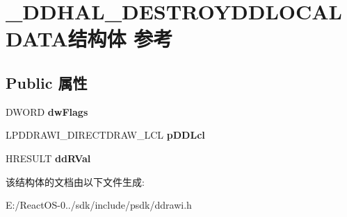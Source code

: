 \hypertarget{struct___d_d_h_a_l___d_e_s_t_r_o_y_d_d_l_o_c_a_l_d_a_t_a}{}\section{\+\_\+\+D\+D\+H\+A\+L\+\_\+\+D\+E\+S\+T\+R\+O\+Y\+D\+D\+L\+O\+C\+A\+L\+D\+A\+T\+A结构体 参考}
\label{struct___d_d_h_a_l___d_e_s_t_r_o_y_d_d_l_o_c_a_l_d_a_t_a}
\subsection*{Public 属性}
\begin{DoxyCompactItemize}
\item 
\mbox{\label{struct___d_d_h_a_l___d_e_s_t_r_o_y_d_d_l_o_c_a_l_d_a_t_a_a8cf196186831bc1743c93a982acfef25}} 
D\+W\+O\+RD {\bfseries dw\+Flags}
\item 
\mbox{\label{struct___d_d_h_a_l___d_e_s_t_r_o_y_d_d_l_o_c_a_l_d_a_t_a_a5d9f3d811483b3974e37540f02871ef5}} 
L\+P\+D\+D\+R\+A\+W\+I\+\_\+\+D\+I\+R\+E\+C\+T\+D\+R\+A\+W\+\_\+\+L\+CL {\bfseries p\+D\+D\+Lcl}
\item 
\mbox{\label{struct___d_d_h_a_l___d_e_s_t_r_o_y_d_d_l_o_c_a_l_d_a_t_a_a884d4c533950af59ad9647e3dbd38300}} 
H\+R\+E\+S\+U\+LT {\bfseries dd\+R\+Val}
\end{DoxyCompactItemize}


该结构体的文档由以下文件生成\+:\begin{DoxyCompactItemize}
\item 
E\+:/\+React\+O\+S-\/0../sdk/include/psdk/ddrawi.\+h\end{DoxyCompactItemize}
